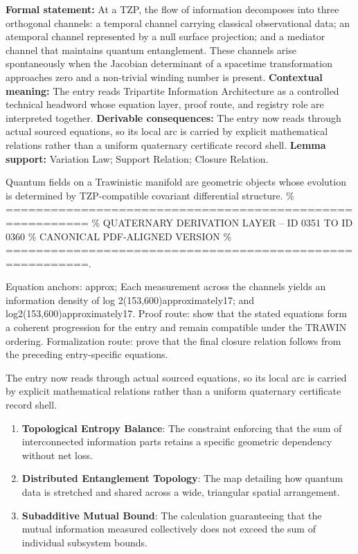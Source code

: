 \begingroup\footnotesize\setlength{\emergencystretch}{3em}\sloppy
\textbf{Formal statement:} At a TZP, the flow of information decomposes into three orthogonal channels: a temporal channel carrying classical observational data; an atemporal channel represented by a null surface projection; and a mediator channel that maintains quantum entanglement. These channels arise spontaneously when the Jacobian determinant of a spacetime transformation approaches zero and a non-trivial winding number is present. \textbf{Contextual meaning:} The entry reads Tripartite Information Architecture as a controlled technical headword whose equation layer, proof route, and registry role are interpreted together. \textbf{Derivable consequences:} The entry now reads through actual sourced equations, so its local arc is carried by explicit mathematical relations rather than a uniform quaternary certificate record shell. \textbf{Lemma support:} Variation Law; Support Relation; Closure Relation.\par
\endgroup

Quantum fields on a Trawinistic manifold are geometric objects whose evolution is determined by TZP-compatible covariant differential structure. \% ========================================================= \% QUATERNARY DERIVATION LAYER -- ID 0351 TO ID 0360 \% CANONICAL PDF-ALIGNED VERSION \% =========================================================.

Equation anchors: approx; Each measurement across the channels yields an information density of log 2(153,600)approximately17; and log2(153,600)approximately17. Proof route: show that the stated equations form a coherent progression for the entry and remain compatible under the TRAWIN ordering. Formalization route: prove that the final closure relation follows from the preceding entry-specific equations.

The entry now reads through actual sourced equations, so its local arc is carried by explicit mathematical relations rather than a uniform quaternary certificate record shell.
\endgroup

\begin{enumerate}[leftmargin=1.6em,itemsep=6pt,topsep=4pt]
\item \textbf{Topological Entropy Balance}: The constraint enforcing that the sum of interconnected information parts retains a specific geometric dependency without net loss.
\item \textbf{Distributed Entanglement Topology}: The map detailing how quantum data is stretched and shared across a wide, triangular spatial arrangement.
\item \textbf{Subadditive Mutual Bound}: The calculation guaranteeing that the mutual information measured collectively does not exceed the sum of individual subsystem bounds.
\end{enumerate}

